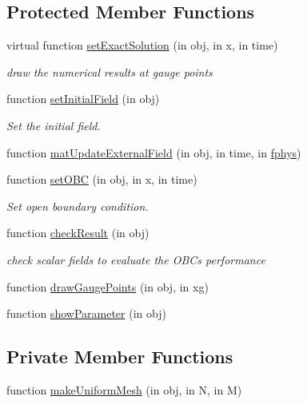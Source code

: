 \subsection*{Protected Member Functions}
\begin{DoxyCompactItemize}
\item 
virtual function \hyperlink{class_open_channel2d_a79563bcdcfbb801f066fa06f94a44594}{set\+Exact\+Solution} (in obj, in x, in time)
\begin{DoxyCompactList}\small\item\em draw the numerical results at gauge points \end{DoxyCompactList}\item 
function \hyperlink{class_open_channel2d_aae4720b1bde2cf5f3729db24fe8e5216}{set\+Initial\+Field} (in obj)
\begin{DoxyCompactList}\small\item\em Set the initial field. \end{DoxyCompactList}\item 
function \hyperlink{class_open_channel2d_a1fb78e2b0cc0ce348774f0c5249710af}{mat\+Update\+External\+Field} (in obj, in time, in \hyperlink{class_ndg_phys_a6b25724fc9474d32018439009072f0a9}{fphys})
\item 
function \hyperlink{class_open_channel2d_ace770faaaf09f0bd86ea6e01f7f95def}{set\+O\+BC} (in obj, in x, in time)
\begin{DoxyCompactList}\small\item\em Set open boundary condition. \end{DoxyCompactList}\item 
function \hyperlink{class_open_channel2d_ae97b262d9cb93c70dcadda529394482d}{check\+Result} (in obj)
\begin{DoxyCompactList}\small\item\em check scalar fields to evaluate the O\+B\+Cs performance \end{DoxyCompactList}\item 
function \hyperlink{class_open_channel2d_aa92c8f61700a74a5732a08d6e60f7234}{draw\+Gauge\+Points} (in obj, in xg)
\item 
function \hyperlink{class_open_channel2d_a94313ac0e4efe573134b1e9eb5518c6d}{show\+Parameter} (in obj)
\end{DoxyCompactItemize}
\subsection*{Private Member Functions}
\begin{DoxyCompactItemize}
\item 
function \hyperlink{class_open_channel2d_ae40e5a9ca854f9146bd58e52d3824aed}{make\+Uniform\+Mesh} (in obj, in N, in M)
\end{DoxyCompactItemize}
